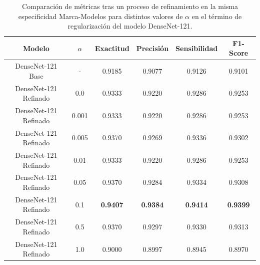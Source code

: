 \begin{table}[h]
	\centering
	\begin{adjustbox}
		{width=0.8\textwidth}
		\begin{tabular}{|c|c|c|c|c|c|}
			\hline
			\textbf{Modelo}       & $\alpha$ & \textbf{Exactitud} & \textbf{Precisión} & \textbf{Sensibilidad} & \textbf{F1-Score} \\
			\hline
			DenseNet-121 Base     & -        & 0.9185             & 0.9077             & 0.9126                & 0.9101            \\
			\hline
			DenseNet-121 Refinado & 0.0      & 0.9333             & 0.9220             & 0.9286                & 0.9253            \\
			\hline
			DenseNet-121 Refinado & 0.001    & 0.9333             & 0.9220             & 0.9286                & 0.9253            \\
			\hline
			DenseNet-121 Refinado & 0.005    & 0.9370             & 0.9269             & 0.9336                & 0.9302            \\
			\hline
			DenseNet-121 Refinado & 0.01     & 0.9333             & 0.9220             & 0.9286                & 0.9253            \\
			\hline
			DenseNet-121 Refinado & 0.05     & 0.9370             & 0.9284             & 0.9334                & 0.9308            \\
			\hline
			DenseNet-121 Refinado & 0.1      & \textbf{0.9407}    & \textbf{0.9384}    & \textbf{0.9414}       & \textbf{0.9399}   \\
			\hline
			DenseNet-121 Refinado & 0.5      & 0.9370             & 0.9297             & 0.9330                & 0.9313            \\
			\hline
			DenseNet-121 Refinado & 1.0      & 0.9000             & 0.8997             & 0.8945                & 0.8970            \\
			\hline
		\end{tabular}
	\end{adjustbox}
	\caption{Comparación de métricas tras un proceso de refinamiento en la misma
		especificidad Marca-Modelos para distintos valores de $\alpha$ en el término
		de regularización del modelo DenseNet-121.}
	\label{tab:densenet-refine}
\end{table}

